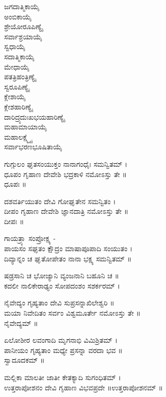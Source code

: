 \begin{multicols}{2}
ಜಗದಾತ್ಮಿಕಾಯೈ\\
ಅಂಬಿಕಾಯೈ\\
ಶ್ರೇಯೋರೂಪಿಣ್ಯೈ\\
ಸರ್ವಾಶ್ರಯಾಯೈ\\
ಸ್ವಧಾಯೈ\\
ಸದಾತ್ಮಿಕಾಯೈ\\
ಮೇಧಾಯೈ\\
ಪತತ್ರಿಹಂತ್ರಿಣ್ಯೈ\\
ಸ್ವರೂಪಿಣ್ಯೈ\\
ಕ್ಲೇಶಾಯೈ\\
ಕ್ಲೇಶಹಾರಿಣ್ಯೈ\\
ದಾರಿದ್ರ್ಯದುಃಖಭಯಹಾರಿಣ್ಯೈ\\
ಮಹಾಮಾಯಾಯೈ\\
ಮಹಾಲಕ್ಷ್ಮ್ಯೈ\\
ಸರ್ವಾಭರಣಭೂಷಿತಾಯೈ
\end{multicols}
ಗುಗ್ಗುಲಂ ಘೃತಸಂಯುಕ್ತಂ ನಾನಾಗಂಧೈಃ ಸಮನ್ವಿತಮ್ ।\\
ಧೂಪಂ ಗೃಹಾಣ ದೇವೇಶಿ ಭದ್ರಕಾಳಿ ನಮೋಽಸ್ತು ತೇ ॥\\
 ಧೂಪಃ ॥

ದಶವರ್ತಿಯುತಂ ದೇವಿ ಗೋಘೃತೇನ ಸಮನ್ವಿತಂ ।\\
ದೀಪಂ ಗೃಹಾಣ ದೇವೇಶಿ ಜ್ಞಾನದಾತ್ರಿ ನಮೋಽಸ್ತು ತೇ ॥\\
ದೀಪಃ ॥

ಗಾಯತ್ರ್ಯಾ ಸಂಪ್ರೋಕ್ಷ್ಯ -\\
ಪಾಯಸಂ ಸಘೃತಂ ಕ್ಷೌದ್ರಂ ಮಾಷಾಪೂಪಾದಿ ಸಂಯುತಂ ।\\
ದಿವ್ಯಾನ್ನಂ ಚ ಘೃತೋಪೇತಂ ನಾನಾ ಭಕ್ಷ್ಯ ಸಮನ್ವಿತಮ್ ॥

ಷಡ್ರಸಾನಿ ಚ ಭೋಜ್ಯಾನಿ ವ್ಯಂಜನಾನಿ ಬಹೂನಿ ಚ ॥\\
ಕದಲೀ ನಾಲಿಕೇರಾಢ್ಯಂ ಸೋಪದಂಶಂ ಸಶರ್ಕರಮ್ ।

ನೈವೇದ್ಯಂ ಗೃಹ್ಯತಾಂ ದೇವಿ ಸುಪ್ರಸನ್ನಾಖಿಲೇಶ್ವರಿ ॥\\
ಮಯಾ ನಿವೇದಿತಂ ಸರ್ವಂ ವಿಶ್ವಮೂರ್ತೇ ನಮೋಽಸ್ತು ತೇ ॥\\
 ನೈವೇದ್ಯಮ್ ॥

ಏಲೋಶೀರ ಲವಂಗಾದಿ ಮೃಗನಾಭಿ ವಿಮಿಶ್ರಿತಮ್ ।\\
ಪಾನೀಯಂ ಗೃಹ್ಯತಾಂ ಮಧ್ಯೇ ಪ್ರಸನ್ನಾ ವರದಾ ಭವ ॥\\
ಸ್ವಾದೂದಕಮ್ ॥

ಮಲ್ಲಿಕಾ ಮಾಲತೀ ಜಾತೀ ಕೇತಕ್ಯಾದಿ ಸುಗಂಧಿತಮ್ ।\\
ಉತ್ತರಾಪೋಶನಂ ದೇವಿ ಗೃಹಾಣ ವಿಭವಪ್ರದೇ ॥ಉತ್ತರಾಪೋಶನಮ್ ॥

